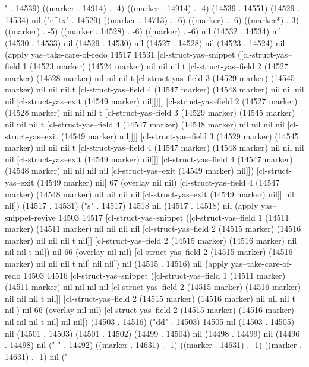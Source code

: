 " . 14539) ((marker . 14914) . -4) ((marker . 14914) . -4) (14539 . 14551) (14529 . 14534) nil ("e^{tx}" . 14529) ((marker . 14713) . -6) ((marker) . -6) ((marker*) . 3) ((marker) . -5) ((marker . 14528) . -6) ((marker) . -6) nil (14532 . 14534) nil (14530 . 14533) nil (14529 . 14530) nil (14527 . 14528) nil (14523 . 14524) nil (apply yas--take-care-of-redo 14517 14531 [cl-struct-yas--snippet ([cl-struct-yas--field 1 (14523 marker) (14524 marker) nil nil nil t [cl-struct-yas--field 2 (14527 marker) (14528 marker) nil nil nil t [cl-struct-yas--field 3 (14529 marker) (14545 marker) nil nil nil t [cl-struct-yas--field 4 (14547 marker) (14548 marker) nil nil nil nil [cl-struct-yas--exit (14549 marker) nil]]]]] [cl-struct-yas--field 2 (14527 marker) (14528 marker) nil nil nil t [cl-struct-yas--field 3 (14529 marker) (14545 marker) nil nil nil t [cl-struct-yas--field 4 (14547 marker) (14548 marker) nil nil nil nil [cl-struct-yas--exit (14549 marker) nil]]]] [cl-struct-yas--field 3 (14529 marker) (14545 marker) nil nil nil t [cl-struct-yas--field 4 (14547 marker) (14548 marker) nil nil nil nil [cl-struct-yas--exit (14549 marker) nil]]] [cl-struct-yas--field 4 (14547 marker) (14548 marker) nil nil nil nil [cl-struct-yas--exit (14549 marker) nil]]) [cl-struct-yas--exit (14549 marker) nil] 67 (overlay nil nil) [cl-struct-yas--field 4 (14547 marker) (14548 marker) nil nil nil nil [cl-struct-yas--exit (14549 marker) nil]] nil nil]) (14517 . 14531) ("s" . 14517) 14518 nil (14517 . 14518) nil (apply yas--snippet-revive 14503 14517 [cl-struct-yas--snippet ([cl-struct-yas--field 1 (14511 marker) (14511 marker) nil nil nil nil [cl-struct-yas--field 2 (14515 marker) (14516 marker) nil nil nil t nil]] [cl-struct-yas--field 2 (14515 marker) (14516 marker) nil nil nil t nil]) nil 66 (overlay nil nil) [cl-struct-yas--field 2 (14515 marker) (14516 marker) nil nil nil t nil] nil nil]) nil (14515 . 14516) nil (apply yas--take-care-of-redo 14503 14516 [cl-struct-yas--snippet ([cl-struct-yas--field 1 (14511 marker) (14511 marker) nil nil nil nil [cl-struct-yas--field 2 (14515 marker) (14516 marker) nil nil nil t nil]] [cl-struct-yas--field 2 (14515 marker) (14516 marker) nil nil nil t nil]) nil 66 (overlay nil nil) [cl-struct-yas--field 2 (14515 marker) (14516 marker) nil nil nil t nil] nil nil]) (14503 . 14516) ("dd" . 14503) 14505 nil (14503 . 14505) nil (14501 . 14503) (14501 . 14502) (14499 . 14504) nil (14498 . 14499) nil (14496 . 14498) nil (" " . 14492) ((marker . 14631) . -1) ((marker . 14631) . -1) ((marker . 14631) . -1) nil ("
